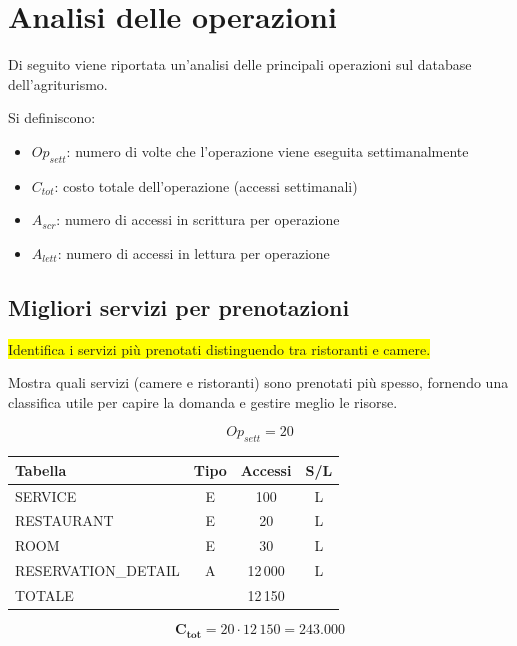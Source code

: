 \documentclass[a4paper,12pt]{report}
\begin{document}
\section{Analisi delle operazioni}
Di seguito viene riportata un'analisi delle principali operazioni
sul database dell'agriturismo.

Si definiscono:
\begin{itemize}
  \item $Op_{sett}$: numero di volte che l'operazione viene eseguita
    settimanalmente
  \item $C_{tot}$: costo totale dell'operazione (accessi settimanali)
  \item $A_{scr}$: numero di accessi in scrittura per operazione
  \item $A_{lett}$: numero di accessi in lettura per operazione
\end{itemize}

\newpage
\subsection*{Migliori servizi per prenotazioni} \label{op1}
\colorbox{yellow}{Identifica i servizi più prenotati distinguendo tra
ristoranti e camere.}

Mostra quali servizi (camere e ristoranti) sono
prenotati più spesso, fornendo una classifica utile per capire la
domanda e gestire meglio le risorse.

$$Op_{sett} = 20$$

\begin{table}[H]
  \centering
  \small
  \renewcommand{\arraystretch}{1.15}
  \begin{tabularx}{0.9\textwidth}{|X|c|c|c|}
    \hline
    \rowcolor{gray!20}
    \textbf{Tabella} & \textbf{Tipo} & \textbf{Accessi} & \textbf{S/L} \\
    \hline
    SERVICE & E & 100 & L \\
    RESTAURANT & E & 20 & L \\
    ROOM & E & 30 & L \\
    RESERVATION\_DETAIL & A & 12\,000 & L \\
    \hline
    \rowcolor{gray!20}
    TOTALE & & 12\,150 & \\
    \hline
  \end{tabularx}
  \vspace{-1em}
\end{table}

$$\mathbf{C_{tot}} = 20 \cdot 12\,150 = \mathbf{243.000}$$
\end{document}
